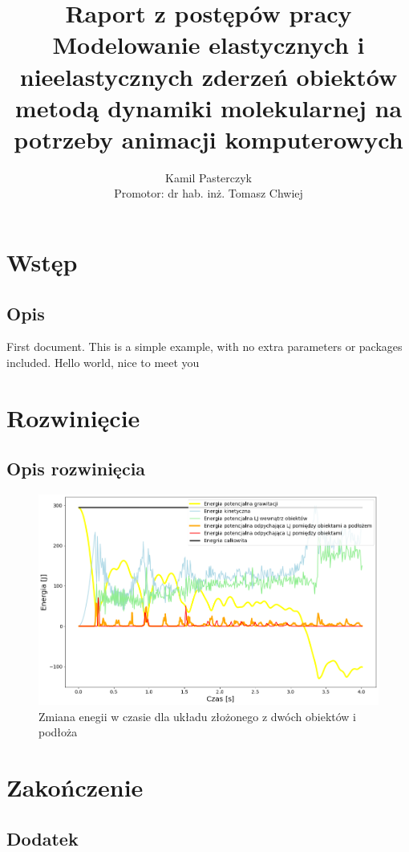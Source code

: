 \documentclass[12pt, letterpaper]{report}
\title{
    Raport z postępów pracy \\
    \large Modelowanie elastycznych i nieelastycznych
    zderzeń obiektów\\
    metodą dynamiki molekularnej na potrzeby animacji
    komputerowych
}
\author{
    Kamil Pasterczyk \\
    \small Promotor: dr hab. inż. Tomasz Chwiej
}
\begin{document}
\maketitle
\tableofcontents

\chapter{Wstęp}
    \section{Opis}
    First document. This is a simple example, with no
    extra parameters or packages included. Hello world, nice to meet you

\chapter{Rozwinięcie}
    \section{Opis rozwinięcia}

    \begin{figure}[h]
        \centering
        \includegraphics[width=16cm]{energy_test_0to4s}
        \caption{Zmiana enegii w czasie dla układu złożonego z dwóch obiektów i podłoża}
    \end{figure}

\chapter{Zakończenie}
    \section{Dodatek}
\end{document}
